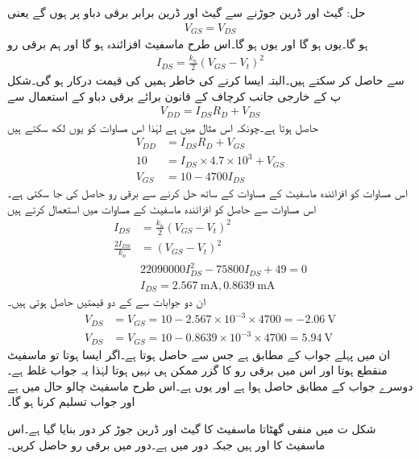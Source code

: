 حل:	گیٹ اور ڈرین جوڑنے سے گیٹ اور ڈرین برابر برقی دباو پر ہوں گے یعنی 
\begin{align*}
V_{GS}=V_{DS}
\end{align*}
ہو گا۔یوں    ہو گا اور یوں  ہو گا۔اس طرح ماسفیٹ افزائندہ ہو گا اور ہم برقی رو
\begin{align*}
I_{DS}=\frac{k_n}{2}\left(V_{GS}-V_t \right )^{2}
\end{align*}
سے حاصل کر سکتے ہیں۔البتہ ایسا کرنے کی خاطر ہمیں  کی قیمت درکار ہو گی۔شکل  پ کے خارجی جانب کرچاف کے قانون برائے برقی دباو کے استعمال سے 
\begin{align*}
V_{DD}=I_{DS} R_D+V_{DS}
\end{align*}
حاصل ہوتا ہے۔چونکہ اس مثال میں   ہے لہٰذا اس مساوات کو یوں لکھ سکتے ہیں
\begin{align*}
V_{DD}&=I_{DS}R_D+V_{GS}\\
10&=I_{DS} \times 4.7 \times 10^{3}+V_{GS}\\
V_{GS}&=10-4700 I_{DS}
\end{align*}
اس مساوات کو افزائندہ ماسفیٹ کے مساوات کے ساتھ حل کرنے سے برقی رو حاصل کی جا سکتی ہے۔اس مساوات سے حاصل  کو افزائندہ ماسفیٹ کے مساوات میں استعمال کرتے ہیں
\begin{align*}
I_{DS}&=\frac{k_n}{2} \left(V_{GS}-V_t \right )^2\\
\frac{2 I_{DS}}{k_n}&= \left(V_{GS}-V_t \right )^2\\
& 22090000I_{DS}^{2}-75800 I_{DS}+49=0\\
& I_{DS}=\SI{2.567}{\milli \ampere}, \SI{0.8639}{\milli \ampere}
\end{align*}
ان دو جوابات سے  کے دو قیمتیں حاصل ہوتی ہیں۔
\begin{align*}
V_{DS}&=V_{GS}=10-2.567 \times 10^{-3} \times 4700=\SI{-2.06}{\volt}\\
V_{DS}&=V_{GS}=10-0.8639 \times 10^{-3} \times 4700=\SI{5.94}{\volt}
\end{align*}
ان میں پہلے جواب کے مطابق  ہے جس سے  حاصل ہوتا ہے۔اگر ایسا ہوتا تو ماسفیٹ منقطع ہوتا اور اس میں برقی رو کا گزر ممکن ہی نہیں ہوتا لہٰذا یہ جواب غلط ہے۔دوسرے جواب کے مطابق    حاصل ہوا ہے اور یوں  ہے۔اس طرح ماسفیٹ چالو حال میں ہے اور جواب تسلیم کرنا ہو گا۔



 
شکل  ت میں منفی گھٹاتا ماسفیٹ کا گیٹ اور ڈرین جوڑ کر دور بنایا گیا ہے۔اس ماسفیٹ کا  اور  ہیں  جبکہ دور میں  ہے۔دور میں برقی رو حاصل کریں۔

